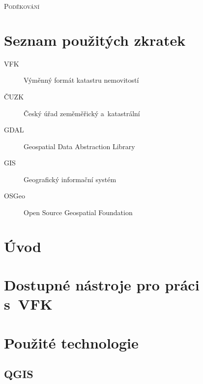 \documentclass[12pt]{article}
\begin{document}
\noindent
\textsc{\Large Poděkování}

\vspace{12pt}

\vspace{2cm}

\clearpage
{}		 %
\section*{Seznam použitých zkratek}

\begin{description}
\item[VFK] Výměnný formát katastru nemovitostí
\item[ČUZK] Český úřad zeměměřický a~katastrální
\item[GDAL] Geospatial Data Abstraction Library
\item[GIS] Geografický informační systém
\item[OSGeo] Open Source Geospatial Foundation
\end{description}


\clearpage
\rhead{{\rightmark}}		%
\tableofcontents

\clearpage
\pagestyle{fancy}		%
\setcounter{page}{1}   	%
\section*{Úvod}




\clearpage
\rhead{{\rightmark}}
\section{Dostupné nástroje pro práci s~VFK}


\clearpage
\section{Použité technologie}

\subsection{QGIS}
\end{document}
